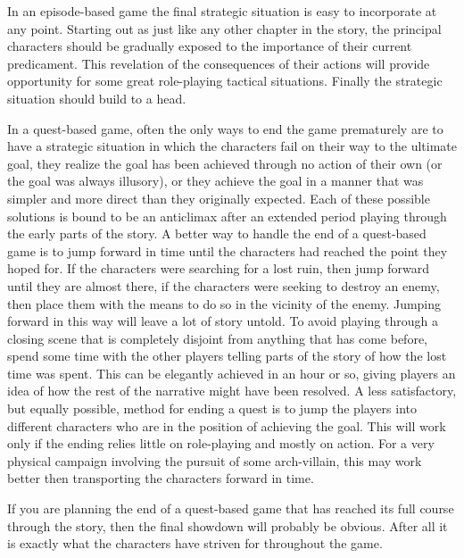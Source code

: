 \documentclass[twoside]{book}
\begin{document}
In an episode-based game the final strategic situation is easy to
incorporate at any point. Starting out as just like any other chapter
in the story, the principal characters should be gradually exposed to
the importance of their current predicament. This revelation of the
consequences of their actions will provide opportunity for some great
role-playing tactical situations. Finally the strategic situation
should build to a head.

In a quest-based game, often the only ways to end the game prematurely
are to have a strategic situation in which the characters fail on
their way to the ultimate goal, they realize the goal has been
achieved through no action of their own (or the goal was always
illusory), or they achieve the goal in a manner that was simpler and
more direct than they originally expected. Each of these possible
solutions is bound to be an anticlimax after an extended period
playing through the early parts of the story. A better way to handle
the end of a quest-based game is to jump forward in time until the
characters had reached the point they hoped for. If the characters
were searching for a lost ruin, then jump forward until they are
almost there, if the characters were seeking to destroy an enemy, then
place them with the means to do so in the vicinity of the
enemy. Jumping forward in this way will leave a lot of story
untold. To avoid playing through a closing scene that is completely
disjoint from anything that has come before, spend some time with the
other players telling parts of the story of how the lost time was
spent. This can be elegantly achieved in an hour or so, giving players
an idea of how the rest of the narrative might have been resolved. A
less satisfactory, but equally possible, method for ending a quest is
to jump the players into different characters who are in the position
of achieving the goal. This will work only if the ending relies little
on role-playing and mostly on action. For a very physical campaign
involving the pursuit of some arch-villain, this may work better then
transporting the characters forward in time.

If you are planning the end of a quest-based game that has reached its
full course through the story, then the final showdown will probably
be obvious. After all it is exactly what the characters have striven
for throughout the game.
\end{document}
